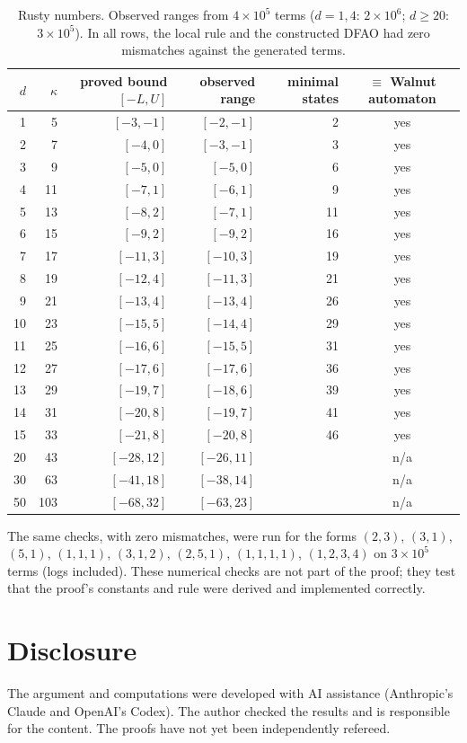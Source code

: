 \documentclass[11pt]{article}
\theoremstyle{remark}\newtheorem{remark}[theorem]{Remark}
\theoremstyle{definition}\newtheorem{definition}[theorem]{Definition}
\begin{document}
\begin{table}[h]\centering\small
\begin{tabular}{rrrrrc}\toprule
\(d\) & \(\kappa\) & proved bound \([-L,U]\) & observed range & minimal states & \(\equiv\) Walnut automaton\\\midrule
1&5&\([-3,-1]\)&\([-2,-1]\)&2&yes\\
2&7&\([-4,0]\)&\([-3,-1]\)&3&yes\\
3&9&\([-5,0]\)&\([-5,0]\)&6&yes\\
4&11&\([-7,1]\)&\([-6,1]\)&9&yes\\
5&13&\([-8,2]\)&\([-7,1]\)&11&yes\\
6&15&\([-9,2]\)&\([-9,2]\)&16&yes\\
7&17&\([-11,3]\)&\([-10,3]\)&19&yes\\
8&19&\([-12,4]\)&\([-11,3]\)&21&yes\\
9&21&\([-13,4]\)&\([-13,4]\)&26&yes\\
10&23&\([-15,5]\)&\([-14,4]\)&29&yes\\
11&25&\([-16,6]\)&\([-15,5]\)&31&yes\\
12&27&\([-17,6]\)&\([-17,6]\)&36&yes\\
13&29&\([-19,7]\)&\([-18,6]\)&39&yes\\
14&31&\([-20,8]\)&\([-19,7]\)&41&yes\\
15&33&\([-21,8]\)&\([-20,8]\)&46&yes\\
20&43&\([-28,12]\)&\([-26,11]\)&&n/a\\
30&63&\([-41,18]\)&\([-38,14]\)&&n/a\\
50&103&\([-68,32]\)&\([-63,23]\)&&n/a\\\bottomrule
\end{tabular}
\caption{Rusty numbers. Observed ranges from \(4\times10^5\) terms (\(d=1,4\): \(2\times10^6\); \(d\ge20\): \(3\times10^5\)). In all rows, the local rule and the constructed DFAO had zero mismatches against the generated terms.}\label{tab}
\end{table}
The same checks, with zero mismatches, were run for the forms \((2,3)\), \((3,1)\), \((5,1)\), \((1,1,1)\), \((3,1,2)\), \((2,5,1)\), \((1,1,1,1)\), \((1,2,3,4)\) on \(3\times10^5\) terms (logs included). These numerical checks are not part of the proof; they test that the proof's constants and rule were derived and implemented correctly.

\section*{Disclosure}
The argument and computations were developed with AI assistance (Anthropic's Claude and OpenAI's Codex). The author checked the results and is responsible for the content. The proofs have not yet been independently refereed.
\end{document}
